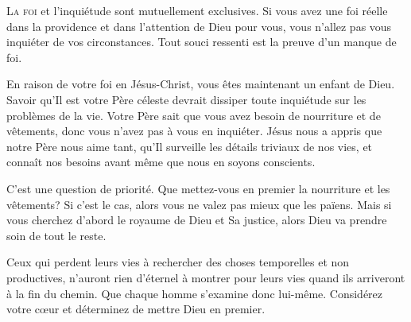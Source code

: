 





\lettrine{L}{a foi} et l'inquiétude sont mutuellement exclusives.
 Si vous avez une foi réelle dans la providence et dans l'attention
 de Dieu pour vous, vous n'allez pas vous inquiéter de vos circonstances.
 Tout souci ressenti est la preuve d'un manque de foi. 

En raison de votre foi en Jésus-Christ, vous êtes maintenant un enfant
 de Dieu. Savoir qu'Il est votre Père céleste devrait dissiper
 toute inquiétude sur les problèmes de la vie. Votre Père sait que vous avez
 besoin de nourriture et de vêtements, donc vous n'avez pas à vous en
 inquiéter. Jésus nous a appris que notre Père nous aime tant,
 qu'Il surveille les détails triviaux de nos vies,
 et connaît nos besoins avant même que nous en soyons conscients. 

C'est une question de priorité. Que mettez-vous en premier
 \ocadr la nourriture et les vêtements? Si c'est le cas,
 alors vous ne valez pas mieux que les païens.
 Mais si vous cherchez d'abord le royaume de Dieu et Sa justice,
 alors Dieu va prendre soin de tout le reste. 


Ceux qui perdent leurs vies à rechercher des choses temporelles
 et non productives, n'auront rien d'éternel à montrer pour leurs vies
 quand ils arriveront à la fin du chemin. Que chaque homme
 s'examine donc lui-même. Considérez votre c\oe{}ur et déterminez
 de mettre Dieu en premier. 

\dvrule




